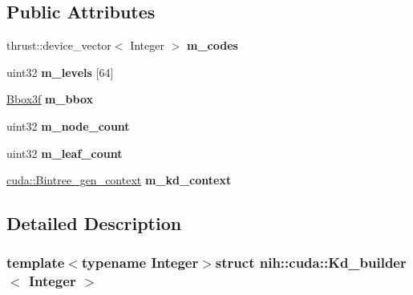 \subsection*{\-Public \-Attributes}
\begin{DoxyCompactItemize}
\item 
\hypertarget{structnih_1_1cuda_1_1_kd__builder_aa620524c7d26050cd6713b2fd619ed45}{
thrust\-::device\-\_\-vector$<$ \-Integer $>$ {\bfseries m\-\_\-codes}}
\label{structnih_1_1cuda_1_1_kd__builder_aa620524c7d26050cd6713b2fd619ed45}

\item 
\hypertarget{structnih_1_1cuda_1_1_kd__builder_aadd42d7e987727d8d480debfecc8e2fe}{
uint32 {\bfseries m\-\_\-levels} \mbox{[}64\mbox{]}}
\label{structnih_1_1cuda_1_1_kd__builder_aadd42d7e987727d8d480debfecc8e2fe}

\item 
\hypertarget{structnih_1_1cuda_1_1_kd__builder_a96b9aebcce9a59a0c9bfe82d973ce547}{
\hyperlink{structnih_1_1_bbox}{\-Bbox3f} {\bfseries m\-\_\-bbox}}
\label{structnih_1_1cuda_1_1_kd__builder_a96b9aebcce9a59a0c9bfe82d973ce547}

\item 
\hypertarget{structnih_1_1cuda_1_1_kd__builder_adfbb54bfad7dc7176f6d87585a1ab29c}{
uint32 {\bfseries m\-\_\-node\-\_\-count}}
\label{structnih_1_1cuda_1_1_kd__builder_adfbb54bfad7dc7176f6d87585a1ab29c}

\item 
\hypertarget{structnih_1_1cuda_1_1_kd__builder_a43a932652753fed10014c39973e5ac2c}{
uint32 {\bfseries m\-\_\-leaf\-\_\-count}}
\label{structnih_1_1cuda_1_1_kd__builder_a43a932652753fed10014c39973e5ac2c}

\item 
\hypertarget{structnih_1_1cuda_1_1_kd__builder_a158d2483ee18b23b53c9b1b5e9e55106}{
\hyperlink{structnih_1_1cuda_1_1_bintree__gen__context}{cuda\-::\-Bintree\-\_\-gen\-\_\-context} {\bfseries m\-\_\-kd\-\_\-context}}
\label{structnih_1_1cuda_1_1_kd__builder_a158d2483ee18b23b53c9b1b5e9e55106}

\end{DoxyCompactItemize}


\subsection{\-Detailed \-Description}
\subsubsection*{template$<$typename Integer$>$struct nih\-::cuda\-::\-Kd\-\_\-builder$<$ Integer $>$}

